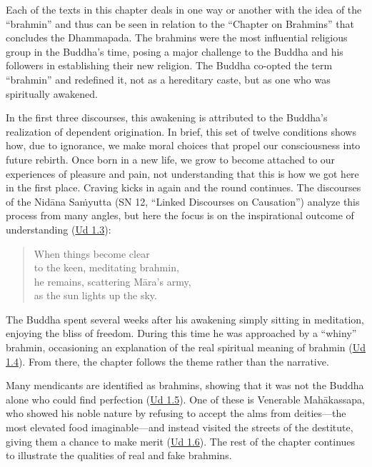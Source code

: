 \documentclass[12pt,openany]{book}%
\begin{document}
Each of the texts in this chapter deals in one way or another with the idea of the “brahmin” and thus can be seen in relation to the “Chapter on Brahmins” that concludes the Dhammapada. The brahmins were the most influential religious group in the Buddha’s time, posing a major challenge to the Buddha and his followers in establishing their new religion. The Buddha co-opted the term “brahmin” and redefined it, not as a hereditary caste, but as one who was spiritually awakened. 

In the first three discourses, this awakening is attributed to the Buddha’s realization of dependent origination. In brief, this set of twelve conditions shows how, due to ignorance, we make moral choices that propel our consciousness into future rebirth. Once born in a new life, we grow to become attached to our experiences of pleasure and pain, not understanding that this is how we got here in the first place. Craving kicks in again and the round continues. The discourses of the \textsanskrit{Nidāna} \textsanskrit{Saṁyutta} (SN 12, “Linked Discourses on Causation”) analyze this process from many angles, but here the focus is on the inspirational outcome of understanding (\href{https://suttacentral.net/ud1.3/en/sujato}{Ud 1.3}):

\begin{verse}%
When things become clear \\
to the keen, meditating brahmin, \\
he remains, scattering \textsanskrit{Māra}’s army, \\
as the sun lights up the sky.

%
\end{verse}

The Buddha spent several weeks after his awakening simply sitting in meditation, enjoying the bliss of freedom. During this time he was approached by a “whiny” brahmin, occasioning an explanation of the real spiritual meaning of brahmin (\href{https://suttacentral.net/ud1.4/en/sujato}{Ud 1.4}). From there, the chapter follows the theme rather than the narrative.

Many mendicants are identified as brahmins, showing that it was not the Buddha alone who could find perfection (\href{https://suttacentral.net/ud1.5/en/sujato}{Ud 1.5}). One of these is Venerable \textsanskrit{Mahākassapa}, who showed his noble nature by refusing to accept the alms from deities—the most elevated food imaginable—and instead visited the streets of the destitute, giving them a chance to make merit (\href{https://suttacentral.net/ud1.6/en/sujato}{Ud 1.6}). The rest of the chapter continues to illustrate the qualities of real and fake brahmins. 
\end{document}
